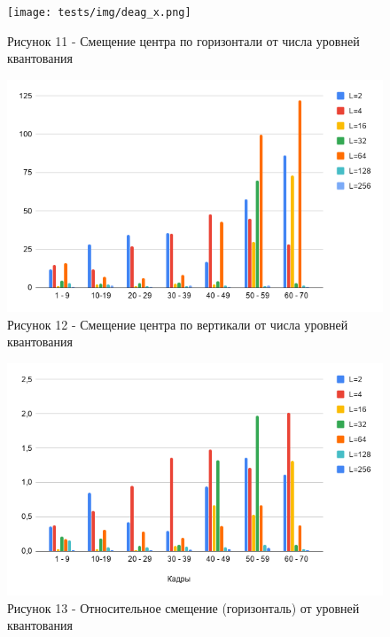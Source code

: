 \documentclass[14pt, a4paper]{article}
\begin{document}




\begin{figure}[h!]
    \centering
    \texttt{[image: tests/img/deag\_x.png]}
    \caption*{Рисунок 11 - Смещение центра по горизонтали от числа уровней квантования}
\end{figure}

\begin{figure}[h!]
    \centering
    \includegraphics[width = 14 cm]{tests/img/diag_y.png}
    \caption*{Рисунок 12 - Смещение центра по вертикали от числа уровней квантования}
\end{figure}





\begin{figure}[h!]
    \centering
    \includegraphics[width = 14 cm]{tests/img/diag_rlt_disp_x.png}
    \caption*{Рисунок 13 - Относительное смещение (горизонталь) от уровней квантования}
    \label{fig:my_label}
\end{figure}
\end{document}
